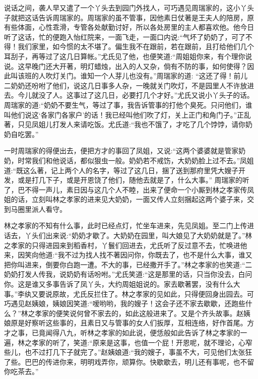\begin{parag}
    说话之间，袭人早又遣了一个丫头去到园门外找人，可巧遇见周瑞家的，这小丫头子就把这话告诉周瑞家的。周瑞家的虽不管事，因他素日仗著是王夫人的陪房，原有些体面，心性乖滑，专管各处献勤讨好，所以各处房里的主人都喜欢他。他今日听了这话，忙的便跑入怡红院来，一面飞走，一面口内说:“气坏了奶奶了，可了不得！我们家里，如今惯的太不堪了。偏生我不在跟前，若在跟前，且打给他们几个耳刮子，再等过了这几日算帐。”尤氏见了他，也便笑道:“周姐姐你来，有个理你说说。这早晚门还大开著，明灯蜡烛，出入的人又杂，倘有不防的事，如何使得？因此叫该班的人吹灯关门。谁知一个人芽儿也没有。”周瑞家的道: “这还了得！前儿二奶奶还吩咐了他们，说这几日事多人杂，一晚就关门吹灯，不是园里人不许放进去。今儿就没了人。这事过了这几日，必要打几个才好。”尤氏又说小丫头子的话。周瑞家的道:“奶奶不要生气，等过了事，我告诉管事的打他个臭死。只问他们，谁叫他们说这‘各家门各家户’的话！我已经叫他们吹了灯，关上正门和角门子。”正乱著，只见凤姐儿打发人来请吃饭。尤氏道:“我也不饿了，才吃了几个饽饽，请你奶奶自吃罢。”
\end{parag}


\begin{parag}
    一时周瑞家的得便出去，便把方才的事回了凤姐，又说:“这两个婆婆就是管家奶奶，时常我们和他说话，都似狠虫一般。奶奶若不戒饬，大奶奶脸上过不去。”凤姐道:“既这么著，记上两个人的名字，等过了这几日，捆了送到那府里凭大嫂子开发，或是打几下子，或是开恩饶了他们，随他去就是了，什么大事。” 周瑞家的听了，巴不得一声儿，素日因与这几个人不睦，出来了便命一个小厮到林之孝家传凤姐的话，立刻叫林之孝家的进来见大奶奶，一面又传人立刻捆起这两个婆子来，交到马圈里派人看守。
\end{parag}


\begin{parag}
    林之孝家的不知有什么事，此时已经点灯，忙坐车进来，先见凤姐。至二门上传进话去，丫头们出来说:“奶奶才歇了。大奶奶在园里，叫大娘见了大奶奶就是了。”林之孝家的只得进园来到稻香村，丫鬟们回进去，尤氏听了反过意不去，忙唤进他来，因笑向他道:“我不过为找人找不著因问你，你既去了，也不是什么大事，谁又把你叫进来，倒要你白跑一遭。不大的事，已经撒开手了。”林之孝家的也笑道:“二奶奶打发人传我，说奶奶有话吩咐。”尤氏笑道:“这是那里的话，只当你没去，白问你。这是谁又多事告诉了凤丫头，大约周姐姐说的。家去歇著罢，没有什么大事。”李纨又要说原故，尤氏反拦住了。林之孝家的见如此，只得便回身出园去。可巧遇见赵姨娘，姨娘因笑道:“嗳哟哟，我的嫂子！这会子还不家去歇歇，还跑些什么？”林之孝家的便笑说何曾不家去的，如此这般进来了。又是个齐头故事。赵姨娘原是好察听这些事的，且素日又与管事的女人们扳厚，互相连络，好作首尾。方才之事，已竟闻得八九，听林之孝家的如此说，便恁般如此告诉了林之孝家的一遍，林之孝家的听了，笑道:“原来是这事，也值一个屁！开恩呢，就不理论，心窄些儿，也不过打几下子就完了。”赵姨娘道:“我的嫂子，事虽不大，可见他们太张狂了些。巴巴的传进你来，明明戏弄你，顽算你。快歇歇去，明儿还有事呢，也不留你吃茶去。”
\end{parag}


